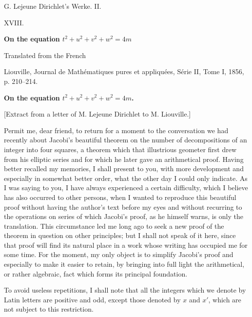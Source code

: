 \documentclass[11pt]{article}
\begin{document}
\begin{center}
{\Large G. Lejeune Dirichlet's Werke. II.}\par\vspace{1.2em}
{\Large XVIII.}\par\vspace{0.5em}
{\LARGE \textbf{On the equation \(t^2+u^2+v^2+w^2=4m\)}}\par\vspace{1em}
{\large Translated from the French}\par\vspace{0.5em}
{\small Liouville, Journal de Mathématiques pures et appliquées, Série II, Tome I, 1856, p. 210--214.}
\end{center}

\bigskip
\begin{center}
{\large \textbf{On the equation \(t^2+u^2+v^2+w^2=4m\).}}
\end{center}

\begin{center}
[Extract from a letter of M. Lejeune Dirichlet to M. Liouville.]
\end{center}

Permit me, dear friend, to return for a moment to the conversation we had recently about Jacobi's beautiful theorem on the number of decompositions of an integer into four squares, a theorem which that illustrious geometer first drew from his elliptic series and for which he later gave an arithmetical proof. Having better recalled my memories, I shall present to you, with more development and especially in somewhat better order, what the other day I could only indicate. As I was saying to you, I have always experienced a certain difficulty, which I believe has also occurred to other persons, when I wanted to reproduce this beautiful proof without having the author's text before my eyes and without recurring to the operations on series of which Jacobi's proof, as he himself warns, is only the translation. This circumstance led me long ago to seek a new proof of the theorem in question on other principles; but I shall not speak of it here, since that proof will find its natural place in a work whose writing has occupied me for some time. For the moment, my only object is to simplify Jacobi's proof and especially to make it easier to retain, by bringing into full light the arithmetical, or rather algebraic, fact which forms its principal foundation.

To avoid useless repetitions, I shall note that all the integers which we denote by Latin letters are positive and odd, except those denoted by \(x\) and \(x'\), which are not subject to this restriction.
\end{document}
